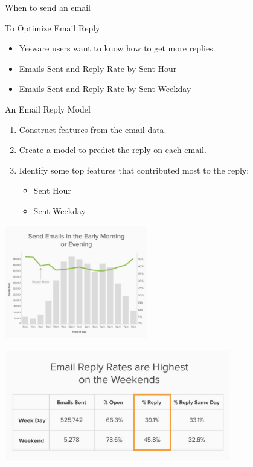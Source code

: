 \documentclass[10pt]{beamer}
\begin{document}
    \begin{frame}{When to send an email}
          \begin{block}{To Optimize Email Reply}
            \begin{itemize}
              \item<1-> Yesware users want to know how to get more replies.
              \item<3-> Emails Sent and Reply Rate by Sent Hour
              \item<4-> Emails Sent and Reply Rate by Sent Weekday
            \end{itemize}
          \end{block}
          \begin{overprint}
              \begin{alertblock}{An Email Reply Model}
                \begin{enumerate}
                  \item Construct features from the email data.
                  \item Create a model to predict the reply on each email.
                  \item Identify some top features that contributed most to the reply:
                    \begin{itemize}
                      \item Sent Hour
                      \item Sent Weekday
                    \end{itemize}
                \end{enumerate}
              \end{alertblock}
            \begin{center}
              \includegraphics[height=140pt]{../graphs/email_analysis_sent_hour}
            \end{center}
            \begin{center}
              \includegraphics[height=140pt]{../graphs/email_analysis_sent_weekday}

\end{center}
\end{overprint}
\end{frame}
\end{document}
